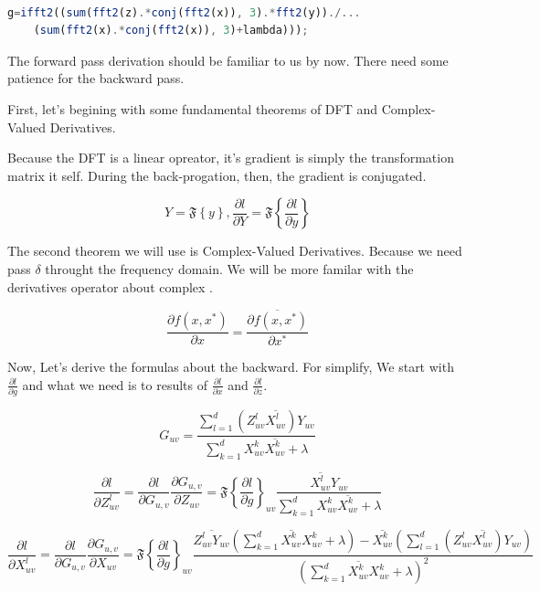 \documentclass[11pt]{article}
\begin{document}
\begin{lstlisting}[language=Octave]

g=ifft2((sum(fft2(z).*conj(fft2(x)), 3).*fft2(y))./...
	(sum(fft2(x).*conj(fft2(x)), 3)+lambda)));

\end{lstlisting}

The forward pass derivation should be familiar to us by now. There need some 
patience for the backward pass.

First, let's begining with  some fundamental theorems of DFT and Complex-Valued Derivatives.

Because the DFT is a linear opreator, it's gradient is simply the transformation matrix it self. During the back-progation, then, the gradient is conjugated.\cite{rippel2015spectral}

$$
Y=\mathfrak{F}\left\{y\right\},\frac{\partial l}{\partial Y} = \mathfrak{F}\left\{\frac{\partial l}{\partial y}\right\}
$$


The second theorem we will use is Complex-Valued Derivatives. \cite{hjorungnes2011complex} Because we need pass $\delta$ throught the frequency domain. We will be more familar with the derivatives operator about complex .

$$
\frac{\partial f(x,x^{*})}{\partial x}=\overline{\frac{\partial f(x,x^{*})}{\partial x^{*}}}
$$
 
Now, Let's derive the formulas about the backward. For simplify, We start with 
 $ \frac{\partial l}{\partial g} $ and what we need is to results of  $ \frac{\partial l}{\partial x} $ and $ \frac{\partial l}{\partial z} $.

$$
G_{uv}=\frac{\sum_{l=1}^{d}(Z_{uv}^{l}\overline{X_{uv}^{l}})Y_{uv}}{\sum_{k=1}^{d}X_{uv}^{k}\overline{X_{uv}^{k}}+\lambda}
$$

$$
\frac{\partial l}{\partial Z_{uv}^{l}}=\frac{\partial l}{\partial G_{u,v}}\frac{\partial G_{u,v}}{\partial Z_{uv}}=\mathfrak{F}\left\{\frac{\partial l}{\partial g}\right\}_{uv}  \frac{\overline{X_{uv}^{l}}Y_{uv}}{\sum_{k=1}^{d}X_{uv}^{k}\overline{X_{uv}^{k}}+\lambda}
$$

$$
\frac{\partial l}{\partial X_{uv}^{l}}
=\frac{\partial l}{\partial G_{u,v}}\frac{\partial G_{u,v}}{\partial X_{uv}}
=\mathfrak{F}\left\{\frac{\partial l}{\partial g}\right\}_{uv}
\frac{
\overline{Z_{uv}^{l}Y_{uv}}(\sum_{k=1}^{d}\overline{X_{uv}^{k}}X_{uv}^{k}+\lambda)-\overline{X_{uv}^{k}}(\sum_{l=1}^{d}(Z_{uv}^{l}\overline{X_{uv}^{l}})Y_{uv})}
{(\sum_{k=1}^{d}\overline{X_{uv}^{k}}X_{uv}^{k}+\lambda)^{2}}
$$
	
\end{document}
